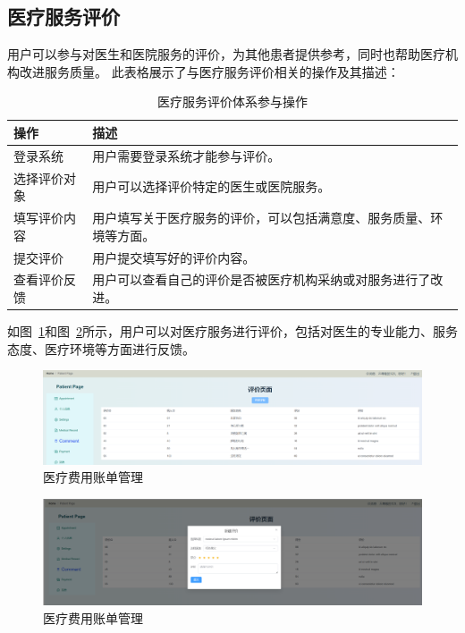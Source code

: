 \subsection{医疗服务评价}
用户可以参与对医生和医院服务的评价，为其他患者提供参考，同时也帮助医疗机构改进服务质量。
此表格展示了与医疗服务评价相关的操作及其描述：
\begin{table}[!h]
	\centering
	\begin{tabular}{|p{6cm}|p{6cm}|}
		\hline
		\textbf{操作} & \textbf{描述} \\
		\hline
		登录系统 & 用户需要登录系统才能参与评价。 \\
		选择评价对象 & 用户可以选择评价特定的医生或医院服务。 \\
		填写评价内容 & 用户填写关于医疗服务的评价，可以包括满意度、服务质量、环境等方面。 \\
		提交评价 & 用户提交填写好的评价内容。 \\
		查看评价反馈 & 用户可以查看自己的评价是否被医疗机构采纳或对服务进行了改进。 \\
		\hline
	\end{tabular}
	\caption{医疗服务评价体系参与操作}
\end{table}
如图~\ref{a113}和图~\ref{a114}所示，用户可以对医疗服务进行评价，包括对医生的专业能力、服务态度、医疗环境等方面进行反馈。
\begin{figure}[!h]
	\centering
	\includegraphics[width=\textwidth]{figures/a13.png}
	\caption{医疗费用账单管理}
	\label{a113}
\end{figure}
\begin{figure}[!h]
	\centering
	\includegraphics[width=\textwidth]{figures/a14.png}
	\caption{医疗费用账单管理}
	\label{a114}
\end{figure}
